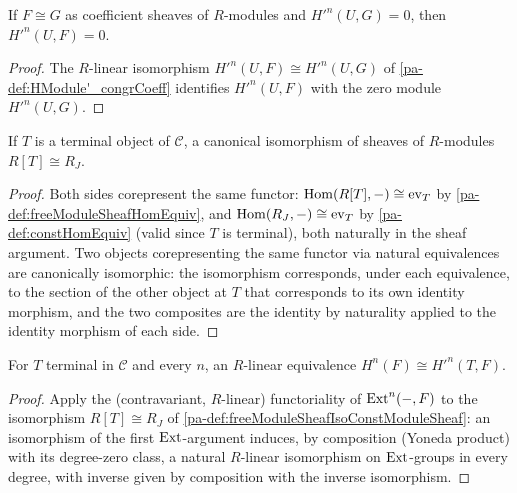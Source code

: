 \begin{lemma}
  \label{pa-lem:HModule'_subsingleton_of_congrCoeff}
  \leanok

  If \(F \cong G\) as coefficient sheaves of \(R\)-modules and \(H'^n(U, G) = 0\), then
  \(H'^n(U, F) = 0\).
\end{lemma}
\begin{proof}
  \leanok
  The \(R\)-linear isomorphism \(H'^n(U, F) \cong H'^n(U, G)\) of \ref{pa-def:HModule'_congrCoeff}
  identifies \(H'^n(U, F)\) with the zero module \(H'^n(U, G)\).
\end{proof}

\begin{definition}
  \label{pa-def:freeModuleSheafIsoConstModuleSheaf}
  \leanok

  If \(T\) is a terminal object of \(\mathcal C\), a canonical isomorphism of sheaves of
  \(R\)-modules \(R[T] \cong R_J\).
\end{definition}
\begin{proof}
  \leanok
  Both sides corepresent the same functor: \(\operatorname{Hom}(R[T], -) \cong \mathrm{ev}_T\) by
  \ref{pa-def:freeModuleSheafHomEquiv}, and \(\operatorname{Hom}(R_J, -) \cong \mathrm{ev}_T\) by
  \ref{pa-def:constHomEquiv} (valid since \(T\) is terminal), both naturally in the sheaf
  argument. Two objects corepresenting the same functor via natural equivalences are
  canonically isomorphic: the isomorphism corresponds, under each equivalence, to the section
  of the other object at \(T\) that corresponds to its own identity morphism, and the two
  composites are the identity by naturality applied to the identity morphism of each side.
\end{proof}

\begin{definition}
  \label{pa-def:HModule_linearEquivHModule'}
  \leanok

  For \(T\) terminal in \(\mathcal C\) and every \(n\), an \(R\)-linear equivalence
  \(H^n(F) \cong H'^n(T, F)\).
\end{definition}
\begin{proof}
  \leanok
  Apply the (contravariant, \(R\)-linear) functoriality of \(\operatorname{Ext}^n(-, F)\) to the
  isomorphism \(R[T] \cong R_J\) of \ref{pa-def:freeModuleSheafIsoConstModuleSheaf}: an
  isomorphism of the first \(\operatorname{Ext}\)-argument induces, by composition (Yoneda product) with
  its degree-zero class, a natural \(R\)-linear isomorphism on \(\operatorname{Ext}\)-groups in every
  degree, with inverse given by composition with the inverse isomorphism.
\end{proof}


